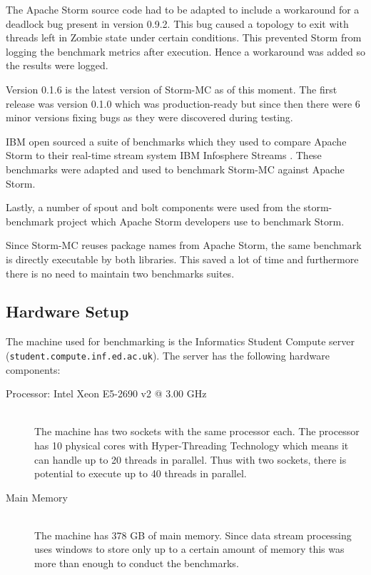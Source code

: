 The Apache Storm source code had to be adapted to include a workaround for a deadlock bug present in version 0.9.2. This bug caused a topology to exit with threads left in Zombie state under certain conditions. This prevented Storm from logging the benchmark metrics after execution. Hence a workaround was added so the results were logged.

Version 0.1.6 is the latest version of Storm-MC as of this moment. The first release was version 0.1.0 which was production-ready but since then there were 6 minor versions fixing bugs as they were discovered during testing.

IBM open sourced a suite of benchmarks which they used to compare Apache Storm to their real-time stream system IBM Infosphere Streams \citep{InfoSphereStreams}. These benchmarks were adapted and used to benchmark Storm-MC against Apache Storm.

Lastly, a number of spout and bolt components were used from the storm-benchmark project which Apache Storm developers use to benchmark Storm.

Since Storm-MC reuses package names from Apache Storm, the same benchmark is directly executable by both libraries. This saved a lot of time and furthermore there is no need to maintain two benchmarks suites.


\subsection{Hardware Setup}

The machine used for benchmarking is the Informatics Student Compute server (\texttt{student.compute.inf.ed.ac.uk}). The server has the following hardware components:

\begin{description}
	\item[Processor: Intel\textsuperscript{\textregistered} Xeon\textsuperscript{\textregistered} E5-2690 v2 @ 3.00 GHz] \hfill \\
	The machine has two sockets with the same processor each. The processor has 10 physical cores with Hyper-Threading Technology which means it can handle up to 20 threads in parallel. Thus with two sockets, there is potential to execute up to 40 threads in parallel.
	\item[Main Memory] \hfill \\
	The machine has 378 GB of main memory. Since data stream processing uses windows to store only up to a certain amount of memory this was more than enough to conduct the benchmarks.
\end{description}

